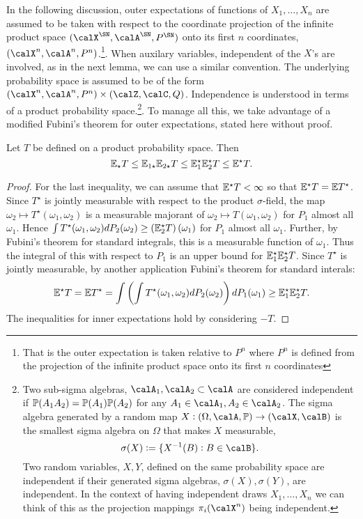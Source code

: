 In the following discussion, outer expectations of functions of \(X_1,\dots,X_n\) are assumed to be taken with respect to the coordinate projection of the infinite product space \((\calX^\SN,\calA^\SN,P^\SN)\) onto its first \(n\) coordinates,  \((\calX^n,\calA^n, P^n)\).\footnote{That is the outer expectation is taken relative to \(P^n\)  where  \(P^n\) is defined from the projection of the infinite product space onto its first  \(n\) coordinates}. When auxilary variables, independent of the \(X\)'s are involved, as in the next lemma, we can use a similar convention. The underlying probability space is assumed to be of the form \((\calX^n,\calA^n,P^n)\times(\calZ,\calC,Q)\). Independence is understood in terms of a product probability space.\footnote{Two sub-sigma algebras, \(\calA_1, \calA_2 \subset\calA\) are considered independent if \(\P(A_1A_2) = \P(A_1)\P(A_2)\) for any  \(A_1 \in \calA_1,A_2\in\calA_2\). The sigma algebra generated by a
random map \(X:\left(\Omega,\calA,\P\right)\to(\calX,\calB)\) is the smallest sigma algebra on \(\Omega\) that makes  \(X\) measurable, 
\[
	\sigma(X) := \{X^{-1}(B):B\in\calB\} 
.\] 
Two random variables, \(X,Y\), defined on the same probability space are independent if their generated sigma algebras, \(\sigma(X),\sigma(Y)\), are independent. In the context of having independent draws \(X_1,\dots,X_n\) we can think of this as the projection mappings \(\pi_i(\calX^n)\) being independent. 
}. To manage all this, we take advantage of a modified Fubini's theorem for outer expectations, stated here without proof. 
\begin{lemma}
	\label{lemma:vdv1.2.6}
	Let \(T\) be defined on a product probability space. Then
	 \[
		 \E_\star T\leq \E_{1\star}\E_{2\star}T\leq \E_1^\star\E_2^\star T \leq \E^\star T
	.\] 
\end{lemma}
\begin{proof}
	For the last inequality, we can assume that \(\E^\star T < \infty\) so that  \(\E^\star T = \E T^\star\). Since \(T^\star\) is jointly measurable with respect to the product  \(\sigma\)-field, the map  \(\omega_2\mapsto T^\star(\omega_1,\omega_2)\) is a measurable majorant of  \(\omega_2\mapsto T(\omega_1,\omega_2)\) for \(P_1\) almost all  \(\omega_1\). Hence \(\int T^\star(\omega_1,\omega_2)dP_2(\omega_2)\geq \left(\E_2^\star T\right)(\omega_1)\) for \(P_1\) almost all  \(\omega_1\). Further, by Fubini's theorem for standard integrals, this is a measurable function of \(\omega_1\). Thus the integral of this with respect to \(P_1\) is an upper bound for \(\E_1^\star\E_2^\star T\). Since  \(T^\star\) is jointly measurable, by another application Fubini's theorem for standard interals:
	 \[
		 \E^\star T = \E T^\star = \int\left(\int T^\star(\omega_1,\omega_2)dP_2(\omega_2)\right)dP_1(\omega_1)\geq \E_1^\star\E_2^\star T 
	.\]
	The inequalities for inner expectations hold by considering \(-T\).
\end{proof}


